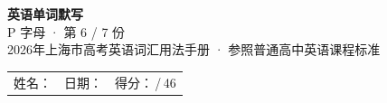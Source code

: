 \documentclass[10pt,a4paper]{article}
\begin{document}
\pagestyle{plain}

\begin{center}
{\LARGE\bfseries 英语单词默写}\\[0.22em]
{\large P 字母 · 第 6 / 7 份}\\[0.18em]
{\small 2026年上海市高考英语词汇用法手册 · 参照普通高中英语课程标准}
\end{center}

\vspace{0.25em}
\noindent\begin{tabular}{@{}p{}@{}p{}@{}p{}@{}}
姓名：\underline{\hspace{2.0cm}} & 日期：\underline{\hspace{2.0cm}} & 得分：\underline{\hspace{1.3cm}}\,/\,46 \\
\end{tabular}

\vspace{0.3em}

\vspace{0.08em}
\end{document}
